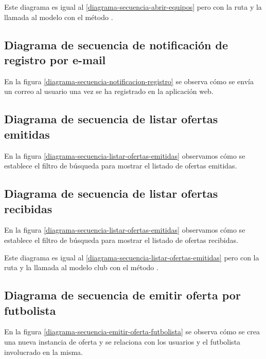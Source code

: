 Este diagrama es igual al \ref{diagrama-secuencia-abrir-equipos} pero con la
ruta  y la llamada al modelo con el método
.


\subsection{Diagrama de secuencia de notificación de registro por e-mail}
En la figura \ref{diagrama-secuencia-notificacion-registro} se observa cómo se
envía un correo al usuario una vez se ha registrado en la aplicación web.



\subsection{Diagrama de secuencia de listar ofertas emitidas}
En la figura \ref{diagrama-secuencia-listar-ofertas-emitidas} observamos cómo se
establece el filtro de búsqueda para mostrar el listado de ofertas emitidas.


\subsection{Diagrama de secuencia de listar ofertas recibidas}
En la figura \ref{diagrama-secuencia-listar-ofertas-emitidas} observamos cómo se
establece el filtro de búsqueda para mostrar el listado de ofertas recibidas.

Este diagrama es igual al \ref{diagrama-secuencia-listar-ofertas-emitidas} pero
con la ruta  y la llamada al modelo club con
el método .

\subsection{Diagrama de secuencia de emitir oferta por futbolista}
En la figura \ref{diagrama-secuencia-emitir-oferta-futbolista} se observa cómo
se crea una nueva instancia de oferta y se relaciona con los usuarios y el
futbolista involucrado en la misma.

